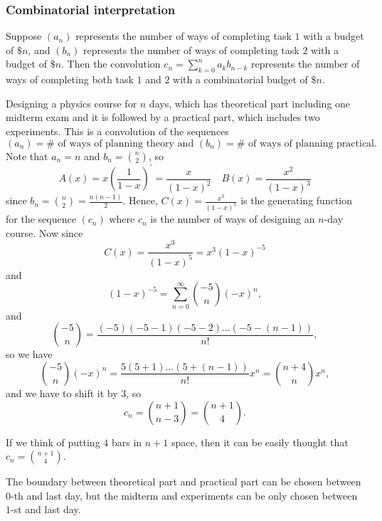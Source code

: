 \subsubsection{Combinatorial interpretation}
Suppose \((a_n)\) represents the number of ways of completing task \(1\) with a budget of \(\$ n\), and \((b_n)\) represents the number of ways of completing task \(2\) with a budget of \(\$ n\). Then the convolution \(c_n = \sum_{k=0}^n a_k b_{n-k} \) represents the number of ways of completing both task \(1\) and \(2\) with a combinatorial budget of \(\$ n\). 
\begin{eg}
    Designing a physics course for \(n\) days, which has theoretical part including one midterm exam and it is followed by a practical part, which includes two experiments. This is a convolution of the sequences 
    \[
        (a_n) = \# \text{ of ways of planning theory} \text{ and } (b_n) = \# \text{ of ways of planning practical}.
    \] Note that \(a_n = n\) and \(b_n = \binom{n}{2}\), so 
    \[
        A(x) = x \left( \frac{1}{1-x} \right)^{\prime} = \frac{x}{(1-x)^2} \quad B(x) = \frac{x^2}{(1-x)^3}
    \] since \(b_n = \binom{n}{2} = \frac{n(n-1)}{2}\). Hence, \(C(x) = \frac{x^3}{(1-x)^5}\) is the generating function for the sequence \((c_n)\) where \(c_n\) is the number of ways of designing an \(n\)-day course. Now since 
    \[
        C(x) = \frac{x^3}{(1-x)^5} = x^3 (1 - x)^{-5}
    \] and 
    \[
        (1-x)^{-5} = \sum_{n=0}^{\infty} \binom{-5}{n} (-x)^n, 
    \]  and 
    \[
        \binom{-5}{n} = \frac{(-5)(-5 - 1)(-5 - 2) \dots (-5 - (n-1))}{n!},
    \] so we have 
    \[
        \binom{-5}{n} (-x)^n = \frac{5(5+1)\dots (5 + (n-1))}{n!} x^n = \binom{n+4}{n} x^n,
    \] and we have to shift it by \(3\), so 
    \[
        c_n = \binom{n+1}{n-3} = \binom{n+1}{4}.
    \] 
\end{eg}       
\begin{remark}
    If we think of putting \(4\) bars in \(n+1\) space, then it can be easily thought that \(c_n = \binom{n+1}{4}\).   
    \begin{note}
        The boundary between theoretical part and practical part can be chosen between \(0\)-th and last day, but the midterm and experiments can be only chosen between \(1\)-st and last day.  
    \end{note}
\end{remark}  
